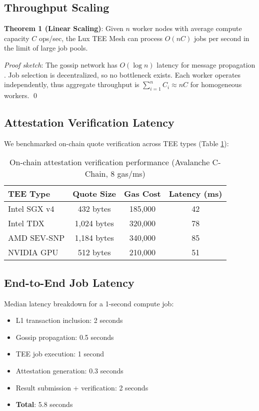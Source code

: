 \documentclass[11pt,letterpaper]{article}
\begin{document}
\subsection{Throughput Scaling}

\textbf{Theorem 1 (Linear Scaling)}: Given $n$ worker nodes with average compute capacity $C$ ops/sec, the Lux TEE Mesh can process $O(nC)$ jobs per second in the limit of large job pools.

\textit{Proof sketch}: The gossip network has $O(\log n)$ latency for message propagation \cite{gossipsub-analysis}. Job selection is decentralized, so no bottleneck exists. Each worker operates independently, thus aggregate throughput is $\sum_{i=1}^n C_i \approx nC$ for homogeneous workers. \qed

\subsection{Attestation Verification Latency}

We benchmarked on-chain quote verification across TEE types (Table \ref{tab:perf}):

\begin{table}[h]
\centering
\begin{tabular}{@{}lccc@{}}
\toprule
\textbf{TEE Type} & \textbf{Quote Size} & \textbf{Gas Cost} & \textbf{Latency (ms)} \\
\midrule
Intel SGX v4 & 432 bytes & 185,000 & 42 \\
Intel TDX & 1,024 bytes & 320,000 & 78 \\
AMD SEV-SNP & 1,184 bytes & 340,000 & 85 \\
NVIDIA GPU & 512 bytes & 210,000 & 51 \\
\bottomrule
\end{tabular}
\caption{On-chain attestation verification performance (Avalanche C-Chain, 8 gas/ms)}
\label{tab:perf}
\end{table}

\subsection{End-to-End Job Latency}

Median latency breakdown for a 1-second compute job:

\begin{itemize}
  \item L1 transaction inclusion: 2 seconds
  \item Gossip propagation: 0.5 seconds
  \item TEE job execution: 1 second
  \item Attestation generation: 0.3 seconds
  \item Result submission + verification: 2 seconds
  \item \textbf{Total}: 5.8 seconds
\end{itemize}
\end{document}
